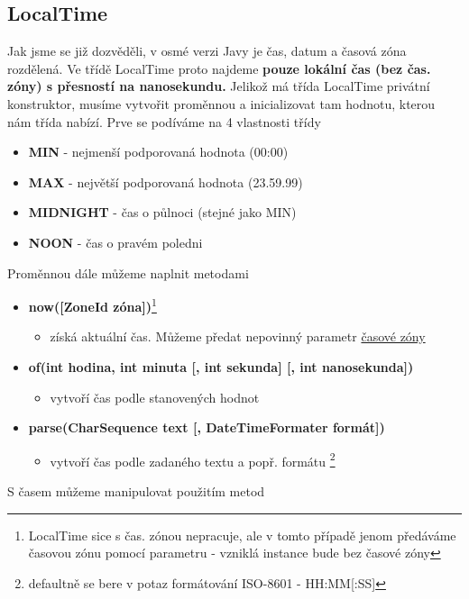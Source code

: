 \documentclass[11pt,a4paper,titlepage]{article}
\begin{document}
\subsection{LocalTime}
Jak jsme se již dozvěděli, v osmé verzi Javy je čas, datum a časová zóna rozdělená. Ve třídě LocalTime proto najdeme \textbf{pouze lokální čas (bez čas. zóny) s přesností na nanosekundu.} Jelikož má třída LocalTime privátní konstruktor, musíme vytvořit proměnnou a inicializovat tam hodnotu, kterou nám třída nabízí. Prve se podíváme na 4 vlastnosti třídy
\begin{itemize}
    \item \textbf{MIN} - nejmenší podporovaná hodnota (00:00)
    \item \textbf{MAX} - největší podporovaná hodnota (23.59.99)
    \item \textbf{MIDNIGHT} - čas o půlnoci (stejné jako MIN)
    \item \textbf{NOON} - čas o pravém poledni
\end{itemize}
Proměnnou dále můžeme naplnit metodami
\begin{itemize}
    \item \textbf{now([ZoneId zóna])}\footnote{LocalTime sice s čas. zónou nepracuje, ale v tomto případě jenom předáváme časovou zónu pomocí parametru - vzniklá instance bude bez časové zóny}
    \begin{itemize}
        \item získá aktuální čas. Můžeme předat nepovinný parametr \href{https://en.wikipedia.org/wiki/List_of_tz_database_time_zones}{časové zóny} 
    \end{itemize}
    \item \textbf{of(int hodina, int minuta [, int sekunda] [, int nanosekunda])}
    \begin{itemize}
        \item vytvoří čas podle stanovených hodnot
    \end{itemize}
    \item \textbf{parse(CharSequence text [, DateTimeFormater formát])}
    \begin{itemize}
        \item vytvoří čas podle zadaného textu a popř. formátu \footnote{defaultně se bere v potaz formátování ISO-8601 - HH:MM[:SS]}
    \end{itemize}
\end{itemize}
S časem můžeme manipulovat použitím metod
\end{document}
